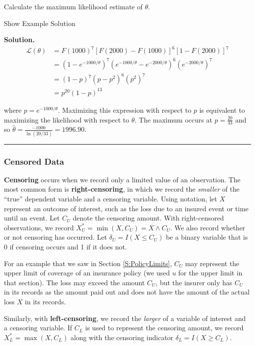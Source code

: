 \documentclass[]{book}
\theoremstyle{definition}
\theoremstyle{definition}
\theoremstyle{definition}
\theoremstyle{remark}
\begin{document}
Calculate the maximum likelihood estimate of \(\theta\).

Show Example Solution

\hypertarget{toggleExampleSelect.3.1}{}
\textbf{Solution.} \[\begin{aligned}
\mathcal{L}(\theta) &= F(1000)^7[F(2000)-F(1000)]^6[1-F(2000)]^7 \\
&= (1-e^{-1000/\theta})^7(e^{-1000/\theta} - e^{-2000/\theta})^6(e^{-2000/\theta})^7 \\
&= (1-p)^7(p-p^2)^6(p^2)^7 \\
&= p^{20}(1-p)^{13}
\end{aligned}\]

where \(p=e^{-1000/\theta}\). Maximizing this expression with respect to
\(p\) is equivalent to maximizing the likelihood with respect to
\(\theta\). The maximum occurs at \(p=\frac{20}{33}\) and so
\(\hat{\theta}=\frac{-1000}{\ln(20/33)}= 1996.90\).

\begin{center}\rule{0.5\linewidth}{\linethickness}\end{center}

\subsubsection{Censored Data}\label{censored-data}

\textbf{Censoring} occurs when we record only a limited value of an
observation. The most common form is \textbf{right-censoring}, in which
we record the \emph{smaller} of the ``true'' dependent variable and a
censoring variable. Using notation, let \(X\) represent an outcome of
interest, such as the loss due to an insured event or time until an
event. Let \(C_U\) denote the censoring amount. With right-censored
observations, we record \(X_U^{\ast}= \min(X, C_U) = X \wedge C_U\). We
also record whether or not censoring has occurred. Let
\(\delta_U= I(X \leq C_U)\) be a binary variable that is 0 if censoring
occurs and 1 if it does not.

For an example that we saw in Section \ref{S:PolicyLimits}, \(C_U\) may
represent the upper limit of coverage of an insurance policy (we used
\(u\) for the upper limit in that section). The loss may exceed the
amount \(C_U\), but the insurer only has \(C_U\) in its records as the
amount paid out and does not have the amount of the actual loss \(X\) in
its records.

Similarly, with \textbf{left-censoring}, we record the \emph{larger} of
a variable of interest and a censoring variable. If \(C_L\) is used to
represent the censoring amount, we record \(X_L^{\ast}= \max(X, C_L)\)
along with the censoring indicator \(\delta_L= I(X \geq C_L)\).
\end{document}

